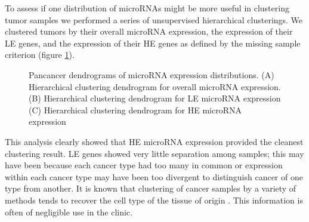 \documentclass[12pt]{report}
\begin{document}
To assess if one distribution of microRNAs might be more useful in clustering tumor samples we performed a series of unsupervised hierarchical clusterings. We clustered
tumors by their overall microRNA expression, the expression of their LE genes, and the expression of their HE genes as defined by the missing sample criterion (figure \ref{fig::dendros}).

\begin{figure}[H]
  \centering
  \caption{Pancancer dendrograms of microRNA expression distributions.
  (A) Hierarchical clustering dendrogram for overall microRNA expression.
  (B) Hierarchical clustering dendrogram for LE microRNA expression
  (C) Hierarchical clustering dendrogram for HE microRNA expression}
 \label{fig::dendros}
\end{figure}

This analysis clearly showed that HE microRNA expression provided the cleanest clustering result. LE genes showed very little separation among samples; this may have been because each
cancer type had too many in common or expression within each cancer type may have been too divergent to distinguish cancer of one type from another. It is known that clustering of cancer
samples by a variety of methods tends to recover the cell type of the tissue of origin \cite{Gaur2007}. This information is often of negligible use in the clinic.



\end{document}
